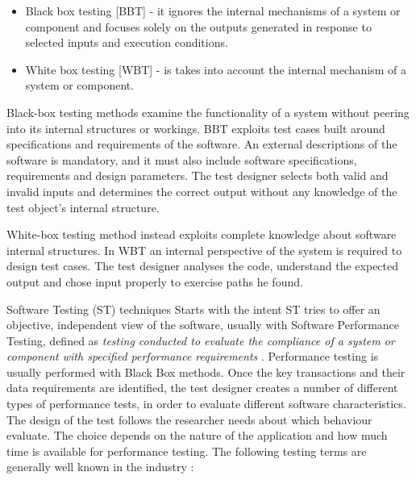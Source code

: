 \begin{itemize}
\item Black box testing [BBT] - it ignores the internal mechanisms of a system or component and focuses solely on the outputs
generated in response to selected inputs and execution conditions.
\item White box testing [WBT] - is takes into account the internal mechanism of a system or component. 
\end{itemize} 

Black-box testing  methods  examine the functionality of a system without peering into its internal structures or workings. BBT exploits test cases built around specifications and requirements of the software. An external descriptions of the software is mandatory, and it must also include software specifications, requirements and design parameters.  The test designer selects both valid and invalid inputs and determines the correct output without any knowledge of the test object's internal structure.

White-box testing  method instead exploits complete knowledge about software internal structures. In WBT an internal perspective of the system is required to design test cases. The test designer analyses the code, understand the expected output and chose input properly  to exercise paths he found. 

Software Testing (ST) techniques Starts with the intent  ST tries to offer an objective, independent view of the software, usually with Software Performance Testing, defined as  \textit{testing conducted to evaluate the compliance of a system
or component with specified performance requirements} \cite{citeulike:1341545}. Performance testing is usually performed with Black Box methods. Once  the key transactions and their data requirements are identified, the test designer creates a number of different types of performance tests, in order to evaluate different software characteristics. The design of the test follows the researcher needs about which behaviour evaluate. The choice depends on the nature of the application and how much time is available for performance testing. The following testing terms are generally well known in the industry \cite{Molyneaux:2009:AAP:1550832}:

